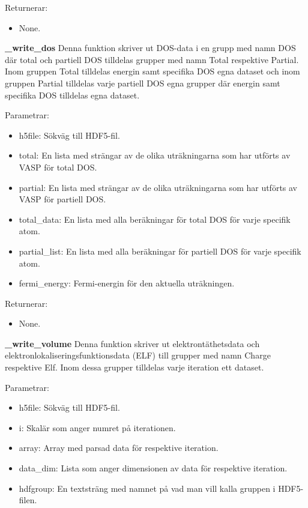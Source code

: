 \documentclass[a4paper,12pt]{article}
\begin{document}
Returnerar:
\begin{itemize}
\setlength\itemsep{0em}
\item None.
\end{itemize}

\textbf{\_write\_dos} \newline
Denna funktion skriver ut DOS-data i en grupp med namn DOS där total och partiell DOS tilldelas grupper med namn Total respektive Partial. Inom gruppen Total tilldelas energin samt specifika DOS
egna dataset och inom gruppen Partial tilldelas varje partiell DOS egna grupper där energin samt specifika DOS tilldelas egna dataset.

Parametrar:
\begin{itemize}
\setlength\itemsep{0em}
\item h5file: Sökväg till HDF5-fil.
\item total: En lista med strängar av de olika uträkningarna som har utförts av VASP för total DOS.
\item partial: En lista med strängar av de olika uträkningarna som har utförts av VASP för partiell DOS.
\item total\_data: En lista med alla beräkningar för total DOS för varje specifik atom.
\item partial\_list: En lista med alla beräkningar för partiell DOS för varje specifik atom.
\item fermi\_energy: Fermi-energin för den aktuella uträkningen.
\end{itemize}

Returnerar:
\begin{itemize}
\setlength\itemsep{0em}
\item None.
\end{itemize}

\textbf{\_write\_volume} \newline
Denna funktion skriver ut elektrontäthetsdata och elektronlokaliseringsfunktionsdata (ELF) till grupper med namn Charge respektive Elf. Inom dessa grupper tilldelas varje iteration ett dataset.

Parametrar:
\begin{itemize}
\setlength\itemsep{0em}
\item h5file: Sökväg till HDF5-fil.
\item i: Skalär som anger numret på iterationen.
\item array: Array med parsad data för respektive iteration.
\item data\_dim: Lista som anger dimensionen av data för respektive iteration.
\item hdfgroup: En textsträng med namnet på vad man vill kalla gruppen i HDF5-filen.
\end{itemize}
\end{document}

